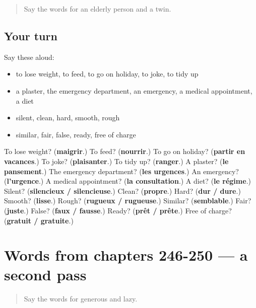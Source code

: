 \label{lesson:FR-R250-first-pass-words-from-chapters-242-245}



\begin{quote}
Say the words for an elderly person and a twin.
\end{quote}

\subsection*{Your turn}
Say these aloud:

\begin{itemize}
\raggedright
  \item to lose weight, to feed, to go on holiday, to joke, to tidy up
  \item a plaster, the emergency department, an emergency, a medical appointment, a diet
  \item silent, clean, hard, smooth, rough
  \item similar, fair, false, ready, free of charge
\end{itemize}

\begin{tcolorbox}[breakable,colback=teal!4,colframe=teal!35!black,title={Before you move on}]
To lose weight? (\textbf{maigrir}.) To feed? (\textbf{nourrir}.) To go on holiday? (\textbf{partir en vacances}.) To joke? (\textbf{plaisanter}.) To tidy up? (\textbf{ranger}.) A plaster? (\textbf{le pansement}.) The emergency department? (\textbf{les urgences}.) An emergency? (\textbf{l'urgence}.) A medical appointment? (\textbf{la consultation}.) A diet? (\textbf{le régime}.) Silent? (\textbf{silencieux / silencieuse}.) Clean? (\textbf{propre}.) Hard? (\textbf{dur / dure}.) Smooth? (\textbf{lisse}.) Rough? (\textbf{rugueux / rugueuse}.) Similar? (\textbf{semblable}.) Fair? (\textbf{juste}.) False? (\textbf{faux / fausse}.) Ready? (\textbf{prêt / prête}.) Free of charge? (\textbf{gratuit / gratuite}.)
\end{tcolorbox}
\section[(dialogue)]{Words from chapters 246-250 — a second pass}

\label{lesson:FR-R250-second-pass-words-from-chapters-246-250}



\begin{quote}
Say the words for generous and lazy.
\end{quote}

